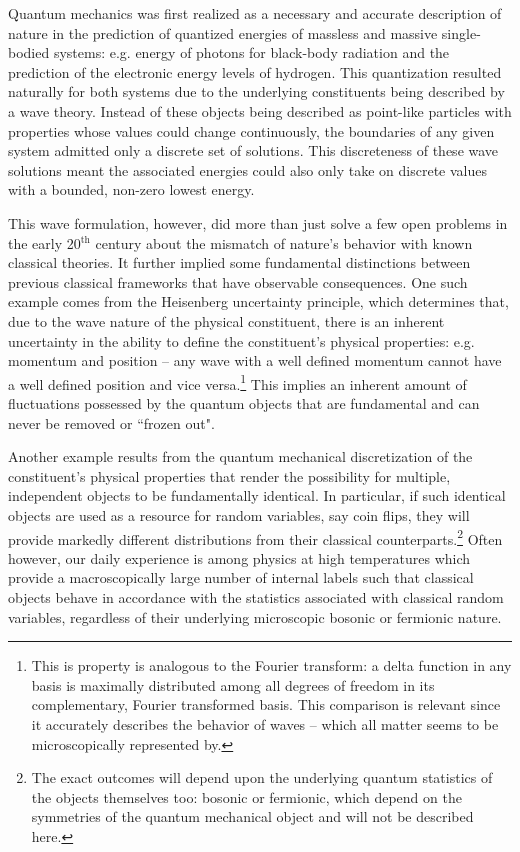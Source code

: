 Quantum mechanics was first realized as a necessary and accurate description of nature in the prediction of quantized energies of massless and massive single-bodied systems: e.g. energy of photons for black-body radiation\cite{Planck1914} and the prediction of the electronic energy levels of hydrogen\cite{Schrodinger1926}. This quantization resulted naturally for both systems due to the underlying constituents being described by a wave theory. Instead of these objects being described as point-like particles with properties whose values could change continuously, the boundaries of any given system admitted only a discrete set of solutions. This discreteness of these wave solutions meant the associated energies could also only take on discrete values with a bounded, non-zero lowest energy. 

This wave formulation, however, did more than just solve a few open problems in the early 20$^{\text{th}}$ century about the mismatch of nature's behavior with known classical theories. It further implied some fundamental distinctions between previous classical frameworks that have observable consequences. One such example comes from the Heisenberg uncertainty principle, which determines that, due to the wave nature of the physical constituent, there is an inherent uncertainty in the ability to define the constituent's physical properties: e.g. momentum and position -- any wave with a well defined momentum cannot have a well defined position and vice versa.\footnote{This is property is analogous to the Fourier transform: a delta function in any basis is maximally distributed among all degrees of freedom in its complementary, Fourier transformed basis. This comparison is relevant since it accurately describes the behavior of waves -- which all matter seems to be microscopically represented by.} This implies an inherent amount of fluctuations possessed by the quantum objects that are fundamental and can never be removed or ``frozen out". 

Another example results from the quantum mechanical discretization of the constituent's physical properties that render the possibility for multiple, independent objects to be fundamentally identical. In particular, if such identical objects are used as a resource for random variables, say coin flips, they will provide markedly different distributions from their classical counterparts.\footnote{The exact outcomes will depend upon the underlying quantum statistics of the objects themselves too: bosonic or fermionic, which depend on the symmetries of the quantum mechanical object and will not be described here.} Often however, our daily experience is among physics at high temperatures which provide a macroscopically large number of internal labels such that classical objects behave in accordance with the statistics associated with classical random variables, regardless of their underlying microscopic bosonic or fermionic nature.

